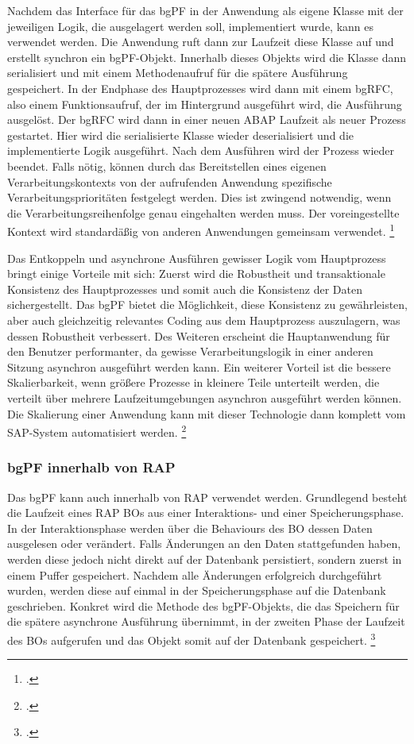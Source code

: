 Nachdem das Interface für das bgPF in der Anwendung als eigene Klasse mit der jeweiligen Logik, die ausgelagert werden soll, implementiert wurde, kann es verwendet werden. Die Anwendung ruft dann zur Laufzeit diese Klasse auf und erstellt synchron ein bgPF-Objekt. Innerhalb dieses Objekts wird die Klasse dann serialisiert und mit einem Methodenaufruf für die spätere Ausführung gespeichert. In der Endphase des Hauptprozesses wird dann mit einem bgRFC, also einem Funktionsaufruf, der im Hintergrund ausgeführt wird, die Ausführung ausgelöst. Der bgRFC wird dann in einer neuen ABAP Laufzeit als neuer Prozess gestartet. Hier wird die serialisierte Klasse wieder deserialisiert und die implementierte Logik ausgeführt. Nach dem Ausführen wird der Prozess wieder beendet. Falls nötig, können durch das Bereitstellen eines eigenen Verarbeitungskontexts von der aufrufenden Anwendung spezifische Verarbeitungsprioritäten festgelegt werden. Dies ist zwingend notwendig, wenn die Verarbeitungsreihenfolge genau eingehalten werden muss. Der voreingestellte Kontext wird standardäßig von anderen Anwendungen gemeinsam verwendet. \footcite[Vgl.][]{sap_bgpf_2023}

Das Entkoppeln und asynchrone Ausführen gewisser Logik vom Hauptprozess bringt einige Vorteile mit sich: Zuerst wird die Robustheit und transaktionale Konsistenz des Hauptprozesses und somit auch die Konsistenz der Daten sichergestellt. Das bgPF bietet die Möglichkeit, diese Konsistenz zu gewährleisten, aber auch gleichzeitig relevantes Coding aus dem Hauptprozess auszulagern, was dessen Robustheit verbessert. Des Weiteren erscheint die Hauptanwendung für den Benutzer performanter, da gewisse Verarbeitungslogik in einer anderen Sitzung asynchron ausgeführt werden kann. Ein weiterer Vorteil ist die bessere Skalierbarkeit, wenn grö{\ss}ere Prozesse in kleinere Teile unterteilt werden, die verteilt über mehrere Laufzeitumgebungen asynchron ausgeführt werden können. Die Skalierung einer Anwendung kann mit dieser Technologie dann komplett vom SAP-System automatisiert werden. \footcite[Vgl.][]{sap_bgpf_2023}

\subsubsection{bgPF innerhalb von RAP}

Das bgPF kann auch innerhalb von RAP verwendet werden. Grundlegend besteht die Laufzeit eines RAP BOs aus einer Interaktions- und einer Speicherungsphase. In der Interaktionsphase werden über die Behaviours des BO dessen Daten ausgelesen oder verändert. Falls Änderungen an den Daten stattgefunden haben, werden diese jedoch nicht direkt auf der Datenbank persistiert, sondern zuerst in einem Puffer gespeichert. Nachdem alle Änderungen erfolgreich durchgeführt wurden, werden diese auf einmal in der Speicherungsphase auf die Datenbank geschrieben. Konkret wird die Methode des bgPF-Objekts, die das Speichern für die spätere asynchrone Ausführung übernimmt, in der zweiten Phase der Laufzeit des BOs aufgerufen und das Objekt somit auf der Datenbank gespeichert. \footcite[Vgl.][]{sap_bgpf_2023}

